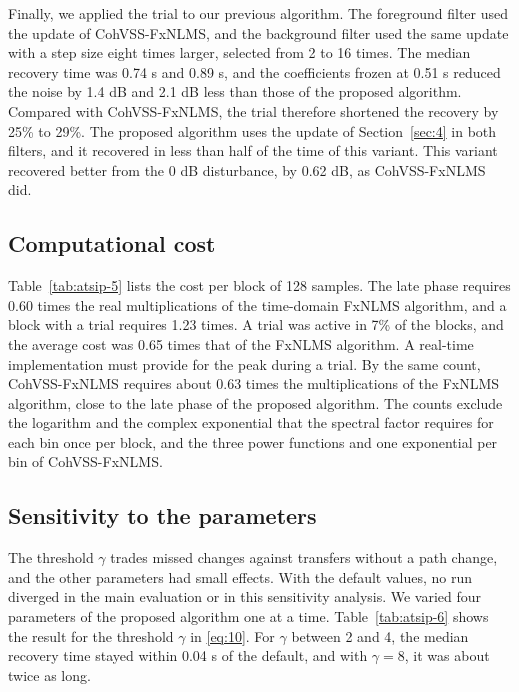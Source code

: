 \documentclass[sip,biber]{now-journal}
\begin{document}
Finally, we applied the trial to our previous algorithm. The foreground filter used the update of CohVSS-FxNLMS, and the background filter used the same update with a step size eight times larger, selected from 2 to 16 times. The median recovery time was 0.74 s and 0.89 s, and the coefficients frozen at 0.51 s reduced the noise by 1.4 dB and 2.1 dB less than those of the proposed algorithm. Compared with CohVSS-FxNLMS, the trial therefore shortened the recovery by 25\% to 29\%. The proposed algorithm uses the update of Section~\ref{sec:4} in both filters, and it recovered in less than half of the time of this variant. This variant recovered better from the 0 dB disturbance, by 0.62 dB, as CohVSS-FxNLMS did.

\hypertarget{sec:7.2}{%
\subsection{Computational cost}\label{sec:7.2}}



Table~\ref{tab:atsip-5} lists the cost per block of 128 samples. The late phase requires 0.60 times the real multiplications of the time-domain FxNLMS algorithm, and a block with a trial requires 1.23 times. A trial was active in 7\% of the blocks, and the average cost was 0.65 times that of the FxNLMS algorithm. A real-time implementation must provide for the peak during a trial. By the same count, CohVSS-FxNLMS requires about 0.63 times the multiplications of the FxNLMS algorithm, close to the late phase of the proposed algorithm. The counts exclude the logarithm and the complex exponential that the spectral factor requires for each bin once per block, and the three power functions and one exponential per bin of CohVSS-FxNLMS.

\hypertarget{sec:7.3}{%
\subsection{Sensitivity to the parameters}\label{sec:7.3}}



The threshold \(\gamma\) trades missed changes against transfers without a path change, and the other parameters had small effects. With the default values, no run diverged in the main evaluation or in this sensitivity analysis. We varied four parameters of the proposed algorithm one at a time. Table~\ref{tab:atsip-6} shows the result for the threshold \(\gamma\) in \eqref{eq:10}. For \(\gamma\) between 2 and 4, the median recovery time stayed within 0.04 s of the default, and with \(\gamma = 8\), it was about twice as long.
\end{document}
